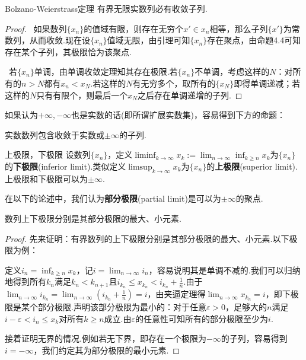 \documentclass[lang=cn, zihao=5]{elegantbook}
\begin{document}
\begin{theorem}{Bolzano-Weierstrass定理}
	有界无限实数列必有收敛子列.
\end{theorem}
\begin{proof}
	~如果数列$\{ x_n \}$的值域有限，则存在无穷个$x' \in x_n$相等，那么子列$\{ x' \}$为常数列，从而收敛.现在设$\{ x_n \}$值域无限，由引理可知$\{ x_n \}$存在聚点，由命题4.4可知存在某个子列，其极限恰为该聚点.
	
	~若$\{ x_n \}$单调，由单调收敛定理知其存在极限.若$\{ x_n \}$不单调，考虑这样的$N$：对所有的$n>N$都有$x_n<x_N$.若这样的$N$有无穷多个，取所有的$\{ x_N \}$即得单调递减；若这样的$N$只有有限个，则最后一个$x_N$之后存在单调递增的子列.
\end{proof}

如果认为$+\infty ,-\infty$也是实数的话(即所谓扩展实数集)，容易得到下方的命题：

\begin{proposition}
	实数数列包含收敛于实数或$\pm \infty$的子列.
\end{proposition}

\begin{definition}{上极限，下极限}
	设数列$\{ x_n \}$，定义$\liminf_{k\to \infty} x_k:=\lim_{n\to \infty} \inf_{k \geq n} x_k$为$\{ x_n \}$的\textbf{下极限}(inferior limit).类似定义$\limsup_{k\to \infty} x_k$为$\{ x_n \}$的\textbf{上极限}(superior limit).上极限和下极限可以为$\pm \infty$.
\end{definition}

在以下的论述中，我们认为\textbf{部分极限}(partial limit)是可以为$\pm \infty$的聚点.

\begin{proposition}
	数列上下极限分别是其部分极限的最大、小元素.
\end{proposition}
\begin{proof}
	先来证明：有界数列的上下极限分别是其部分极限的最大、小元素.以下极限为例：
	
	定义$i_n=\inf_{k\geq n}x_k$，记$i=\lim_{n\to \infty} i_{n}$，容易说明其是单调不减的.我们可以归纳地得到所有$k_n$满足$k_n<k_{n+1}$且$i_{k_n} \leq x_{k_n} < i_{k_n}+\frac{1}{n}$.由于$\lim_{n\to \infty} i_{k_n} = \lim_{n\to \infty} (i_{k_n}+\frac{1}{n} ) = i$，由夹逼定理得$\lim_{n\to \infty} x_{k_n}=i$，即下极限是某个部分极限.声明该部分极限为最小的：对于任意$\varepsilon >0$，足够大的$n$满足$i-\varepsilon < i_n \leq x_k$对所有$k \geq n$成立.由$\varepsilon$的任意性可知所有的部分极限至少为$i$.
	
	接着证明无界的情况.例如若无下界，即存在一个极限为$-\infty$的子列，容易得到$i=-\infty$，我们约定其为部分极限的最小元素.
\end{proof}
\end{document}
